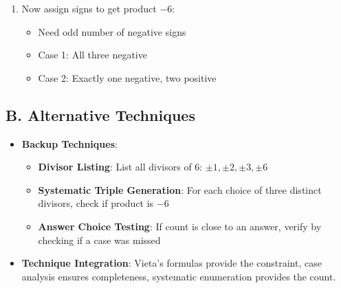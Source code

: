 \documentclass[12pt]{article}
\begin{document}
\begin{techniquesbox}
\begin{itemize}[leftmargin=*]
\begin{enumerate}
\begin{itemize}
            \item $6 = 1 \cdot 1 \cdot 6$ (not all distinct)
            \item $6 = 1 \cdot 2 \cdot 3$ $\checkmark$ (all distinct)
        \end{itemize}
        \item Now assign signs to get product $-6$:
        \begin{itemize}
            \item Need odd number of negative signs
            \item Case 1: All three negative
            \item Case 2: Exactly one negative, two positive
        \end{itemize}
    \end{enumerate}
\end{itemize}

\subsection*{B. Alternative Techniques}
\begin{itemize}[leftmargin=*]
    \item \textbf{Backup Techniques}: 
    \begin{itemize}
        \item \textbf{Divisor Listing}: List all divisors of 6: $\pm 1, \pm 2, \pm 3, \pm 6$
        \item \textbf{Systematic Triple Generation}: For each choice of three distinct divisors, check if product is $-6$
        \item \textbf{Answer Choice Testing}: If count is close to an answer, verify by checking if a case was missed
    \end{itemize}
    \item \textbf{Technique Integration}: Vieta's formulas provide the constraint, case analysis ensures completeness, systematic enumeration provides the count.
\end{itemize}
\end{techniquesbox}
\end{document}
